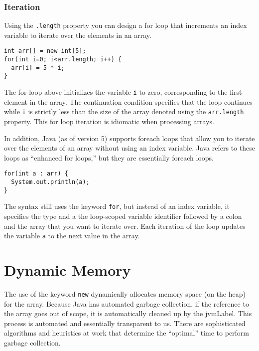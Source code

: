 \subsubsection{Iteration}

Using the \texttt{.length} property you can design a 
for loop that
increments an index variable to iterate over the elements in
an array.

\begin{verbatim}
int arr[] = new int[5];
for(int i=0; i<arr.length; i++) {
  arr[i] = 5 * i;
}
\end{verbatim}

The for loop above initializes the variable \texttt{i} to zero,
corresponding to the first element in the array.  The continuation
condition specifies that the loop continues while \texttt{i}
is strictly less than the size of the array denoted using the
\texttt{arr.length} property.  This for loop iteration
is idiomatic when processing arrays.

In addition, Java (as of version 5) supports foreach loops that 
allow you to iterate over the elements of an array without using
an index variable.  Java refers to these loops as ``enhanced
for loops,'' but they are essentially foreach loops.  

\begin{verbatim}
for(int a : arr) {
  System.out.println(a);
}
\end{verbatim}

The syntax still uses the keyword \texttt{for}, but instead
of an index variable, it specifies the type and a the loop-scoped variable
identifier followed by a colon and the array that you want to iterate
over.  Each iteration of the loop updates the variable \texttt{a}
to the next value in the array.  

\section{Dynamic Memory}

The use of the keyword \texttt{new} dynamically allocates 
memory space (on the heap) for the array.  Because Java has
automated garbage collection, if the reference to the array goes
out of scope, it is automatically cleaned up by the \gls{jvmLabel}.
This process is automated and essentially transparent to us.
There are sophisticated algorithms and heuristics
at work that determine the ``optimal'' time to perform garbage
collection.

